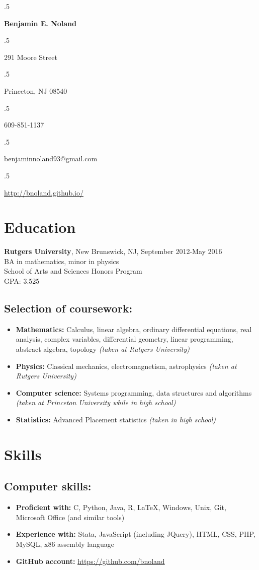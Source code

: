 \documentclass[12pt]{article}
\begin{document}
\moveleft.5\hoffset\centerline{\Large\bf Benjamin E. Noland}
\smallskip
\moveleft.5\hoffset\centerline{291 Moore Street}
\moveleft.5\hoffset\centerline{Princeton, NJ 08540}
\moveleft.5\hoffset\centerline{609-851-1137}
\moveleft.5\hoffset\centerline{benjaminnoland93@gmail.com}
\moveleft.5\hoffset\centerline{\url{http://bnoland.github.io/}}

\section*{Education}

\textbf{Rutgers University}, New Brunswick, NJ, September 2012-May 2016 \\
BA in mathematics, minor in physics \\
School of Arts and Sciences Honors Program \\
GPA: 3.525

\subsection*{Selection of coursework:}
\begin{itemize}
\item
\textbf{Mathematics:} Calculus, linear algebra, ordinary differential equations, real analysis, complex variables, differential geometry, linear programming, abstract algebra, topology \textit{(taken at Rutgers University)}

\item
\textbf{Physics:}
Classical mechanics, electromagnetism, astrophysics \textit{(taken at Rutgers University)}

\item
\textbf{Computer science:}
Systems programming, data structures and algorithms \textit{(taken at Princeton University while in high school)}

\item
\textbf{Statistics:} Advanced Placement statistics \textit{(taken in high school)}

\end{itemize}

\section*{Skills}

\subsection*{Computer skills:}
\begin{itemize}
\item
\textbf{Proficient with:} C, Python, Java, R, \LaTeX, Windows, Unix, Git, Microsoft Office (and similar tools)
\item
\textbf{Experience with:} Stata, JavaScript (including JQuery), HTML, CSS, PHP, MySQL, x86 assembly language
\item
\textbf{GitHub account:} \url{https://github.com/bnoland}
\end{itemize}
\end{document}
